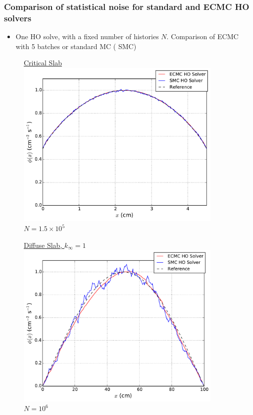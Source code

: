\documentclass[xcolor=dvipsnames,handout,unknownkeysallowed]{beamer}
\newcommand{\colb}[1]{{\color{blue} #1}}
\newcommand{\colr}[1]{{\color{red} #1}}
\newlength{\wideitemsep}
\let\olditem\item
\renewcommand{\item}{\setlength{\itemsep}{\wideitemsep}\olditem}
\begin{document}
\begin{frame}
    \frametitle{Comparison of statistical noise for standard and ECMC HO solvers}
    \begin{block}{}
    \begin{itemize}
        \item One HO solve, with a fixed number of histories $N$. Comparison of
            \colr{ECMC} with 5 batches or standard MC (\colb{SMC}) 
    \end{itemize}
    \end{block}
  \begin{minipage}{0.49\textwidth}
  \begin{figure}
    \centering
    \underline{Critical Slab}
    \includegraphics[width=0.89\textwidth]{sood_smc_compare.pdf} \\
      \hspace{0.1in}$N=1.5\times10^5$
  \end{figure}
  \end{minipage}
  \begin{minipage}{0.49\textwidth}
  \begin{figure}
    \centering
    \underline{Diffuse Slab, $k_\infty=1$}
    \includegraphics[width=0.89\textwidth]{smc_compare.pdf} \\
    \hspace{0.3in}$N=10^6$
  \end{figure}
  \end{minipage}


\end{frame}
\end{document}
